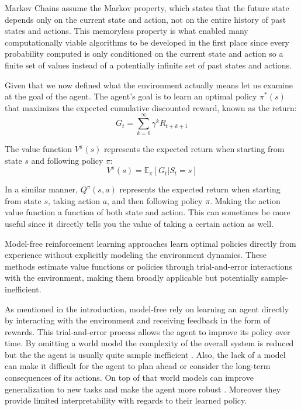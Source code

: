 \documentclass[
	english,
	ruledheaders=section,
	class=report,
	thesis={type=master},
	accentcolor=9c,
	custommargins=true,
	marginpar=false,
	parskip=half-,
	fontsize=11pt,
]{tudapub}
\begin{document}
Markov Chains assume the Markov property, which states that the future state
depends only on the current state and action, not on the entire history of past
states and actions. This memoryless property is what enabled many
computationally viable algorithms to be developed in the first place since
every probability computed is only conditioned on the current state and action
so a finite set of values instead of a potentially infinite set of past states
and actions.

Given that we now defined what the environment actually means let us examine at
the goal of the agent. The agent's goal is to learn an optimal policy
$\pi^*(s)$ that maximizes the expected cumulative discounted reward, known as
the return:
\begin{equation}
	G_t = \sum_{k=0}^{\infty} \gamma^k R_{t+k+1}
\end{equation}

The value function $V^\pi(s)$ represents the expected return when starting from
state $s$ and following policy $\pi$:
\begin{equation}
	V^\pi(s) = \mathbb{E}_\pi[G_t | S_t = s]
\end{equation}

In a similar manner, $Q^\pi(s,a)$ represents the expected return when starting
from state $s$, taking action $a$, and then following policy $\pi$. Making the
action value function a function of both state and action. This can sometimes
be more useful since it directly tells you the value of taking a certain action
as well.

Model-free reinforcement learning approaches learn optimal policies directly
from experience without explicitly modeling the environment dynamics. These
methods estimate value functions or policies through trial-and-error
interactions with the environment, making them broadly applicable but
potentially sample-inefficient.

As mentioned in the introduction, model-free rely on learning an agent directly
by interacting with the environment and receiving feedback in the form of
rewards. This trial-and-error process allows the agent to improve its policy
over time. By omitting a world model the complexity of the overall system is
reduced but the the agent is usually quite sample inefficient
\cite{duan2016benchmarking,kaiser2019model}. Also, the lack of a model can make
it difficult for the agent to plan ahead or consider the long-term consequences
of its actions. On top of that world models can improve generalization to new
tasks and make the agent more robust \cite{ha2018world,hafner2020dream}.
Moreover they provide limited interpretability with regards to their learned
policy.
\end{document}
